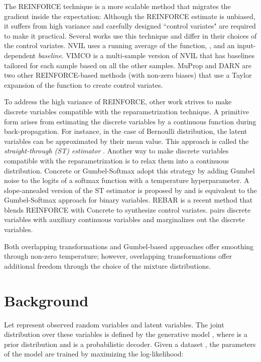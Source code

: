 \documentclass{article}
\begin{document}
The REINFORCE technique \cite{williams1992simple} is a more scalable method that migrates the gradient inside the expectation: 
Although the REINFORCE estimate is unbiased, it suffers from high variance and carefully designed ``control variates" are required to make it practical. 
Several works use this technique and differ in their choices of the control variates. NVIL \cite{mnih2014neural} uses a running average of 
the function, , and an input-dependent \emph{baseline}. 
VIMCO \cite{mnih2016variational} is a multi-sample version of NVIL that has baselines tailored for each sample based on all the other samples. MuProp \cite{gu2015muprop} and DARN \cite{gregorICML14} are two other 
REINFORCE-based methods (with non-zero biases) that use a Taylor expansion of the function  to create control variates.

To address the high variance of REINFORCE, other work strives to make discrete variables compatible with the reparametrization technique. A primitive form arises from estimating the discrete variables by a continuous function during back-propagation. For instance, in the case of Bernoulli distribution, the latent variables can be approximated by their mean value. This approach is called the \textit{straight-through (ST) estimator} \cite{bengio2013estimating}.  Another way to make discrete variables compatible with the reparametrization is to relax them into a continuous distribution. Concrete \cite{maddison2016concrete} or Gumbel-Softmax \cite{jang2016categorical} adopt this strategy by adding Gumbel noise to the logits of a softmax function with a temperature hyperparameter. A slope-annealed version of the ST estimator is proposed by \cite{chung2016hierarchical} and is equivalent to the Gumbel-Softmax approach for binary variables. REBAR \cite{tucker2017rebar} is a recent method that blends REINFORCE with Concrete to synthesize control variates. \cite{rolfe2016discrete} pairs discrete variables with auxiliary continuous variables and marginalizes out the discrete variables. 

Both overlapping transformations and Gumbel-based approaches offer smoothing through non-zero temperature; however, overlapping transformations
offer additional freedom through the choice of the mixture distributions. 

\section{Background}

Let  represent observed random variables and  latent variables. The joint distribution 
over these variables is defined by the generative model , where 
is a prior distribution and  is a probabilistic decoder. Given a dataset ,
the parameters of the model are trained by maximizing the log-likelihood:
\end{document}
